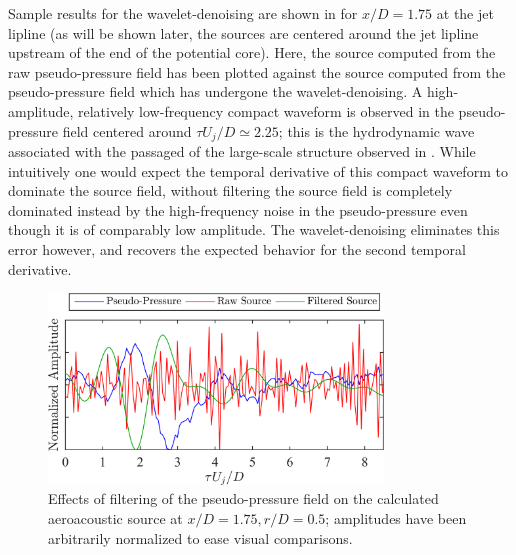 
Sample results for the wavelet-denoising are shown in  for $x/D=1.75$ at the jet lipline (as will be shown later, the sources are centered around the jet lipline upstream of the end of the potential core).
Here, the source computed from the raw pseudo-pressure field has been plotted against the source computed from the pseudo-pressure field which has undergone the wavelet-denoising.
A high-amplitude, relatively low-frequency compact waveform is observed in the pseudo-pressure field centered around $\tau U_j /D \simeq 2.25$; this is the hydrodynamic wave associated with the passaged of the large-scale structure observed in .
While intuitively one would expect the temporal derivative of this compact waveform to dominate the source field, without filtering the source field is completely dominated instead by the high-frequency noise in the pseudo-pressure even though it is of comparably low amplitude.
The wavelet-denoising eliminates this error however, and recovers the expected behavior for the second temporal derivative.
\begin{figure}
	\centering
	\includegraphics[width = 3.5in]{Figures/ch5_valid_denoising.png}
	\caption{Effects of filtering of the pseudo-pressure field on the calculated aeroacoustic source at $x/D = 1.75, r/D = 0.5$; amplitudes have been arbitrarily normalized to ease visual comparisons.}
	\label{fig:valid_denoising}
\end{figure}

